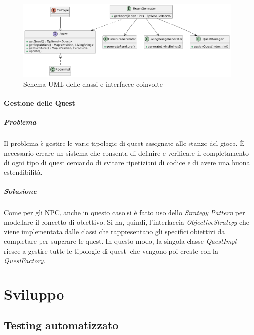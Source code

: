 \documentclass[a4paper,12pt]{report}
\begin{document}
\begin{figure}[H]
	\centering
	\includegraphics[width=\textwidth]{img/RoomUML.png}
	\caption{Schema UML delle classi e interfacce coinvolte}
	\label{img:RoomUML}
\end{figure}


\subsubsection{Gestione delle Quest}
\paragraph{Problema} Il problema è gestire le varie tipologie di quest assegnate alle stanze del gioco. È necessario creare un sistema che consenta di definire 
e verificare il completamento di ogni tipo di quest cercando di evitare ripetizioni di codice e di avere una buona estendibilità.
\paragraph{Soluzione} Come per gli NPC, anche in questo caso si è fatto uso dello \textit{Strategy Pattern} per modellare il concetto di obiettivo.
Si ha, quindi, l'interfaccia \textit{ObjectiveStrategy} che viene implementata dalle classi che rappresentano gli specifici obiettivi da completare per superare le quest.
In questo modo, la singola classe \textit{QuestImpl} riesce a gestire tutte le tipologie di quest, che vengono poi create con la \textit{QuestFactory}.


\chapter{Sviluppo}

\section{Testing automatizzato}
\end{document}
